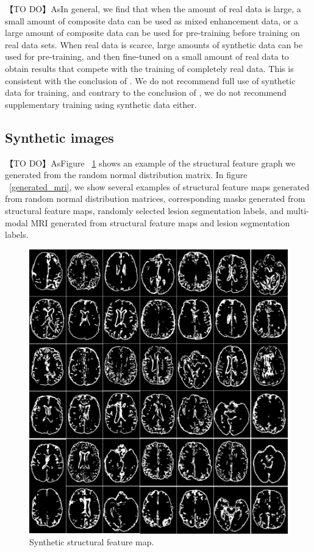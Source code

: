 \documentclass[letterpaper]{article} %
\begin{document}
【TO DO】AsIn general, we find that when the amount of real data is large, a small amount of composite data can be used as mixed enhancement data, or a large amount of composite data can be used for pre-training before training on real data sets. When real data is scarce, large amounts of synthetic data can be used for pre-training, and then fine-tuned on a small amount of real data to obtain results that compete with the training of completely real data. This is consistent with the conclusion of \cite{4shin2018medical}. We do not recommend full use of synthetic data for training, and contrary to the conclusion of \cite{4shin2018medical}, we do not recommend supplementary training using synthetic data either.

\subsection{Synthetic images}
【TO DO】AsFigure ~\ref{generated_f} shows an example of the structural feature graph we generated from the random normal distribution matrix. In figure ~\ref{generated_mri}, we show several examples of structural feature maps generated from random normal distribution matrices, corresponding masks generated from structural feature maps, randomly selected lesion segmentation labels, and multi-modal MRI generated from structural feature maps and lesion segmentation labels.
\begin{figure}
	\centering
	\includegraphics[width=0.8\linewidth]{figures/Fs}
	\caption{Synthetic structural feature map.}
	\label{generated_f}
\end{figure}
\end{document}

